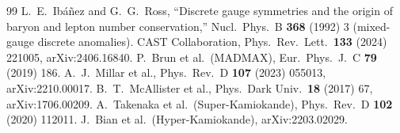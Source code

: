 \documentclass[11pt,a4paper]{article}
\begin{document}
\begin{thebibliography}{99}
 L.~E.~Ib\'a\~nez and G.~G.~Ross, ``Discrete gauge
  symmetries and the origin of baryon and lepton number conservation,''
  Nucl.\ Phys.\ B \textbf{368} (1992) 3 (mixed-gauge discrete
  anomalies).
 CAST Collaboration, Phys.\ Rev.\ Lett.\ \textbf{133}
  (2024) 221005, arXiv:2406.16840.
 P.~Brun et al.\ (MADMAX), Eur.\ Phys.\ J.\ C
  \textbf{79} (2019) 186.
 A.~J.~Millar et al., Phys.\ Rev.\ D \textbf{107}
  (2023) 055013, arXiv:2210.00017.
 B.~T.~McAllister et al., Phys.\ Dark Univ.\ \textbf{18}
  (2017) 67, arXiv:1706.00209.
 A.~Takenaka et al.\ (Super-Kamiokande),
  Phys.\ Rev.\ D \textbf{102} (2020) 112011.
 J.~Bian et al.\ (Hyper-Kamiokande),
  arXiv:2203.02029.
\end{thebibliography}
\end{document}
